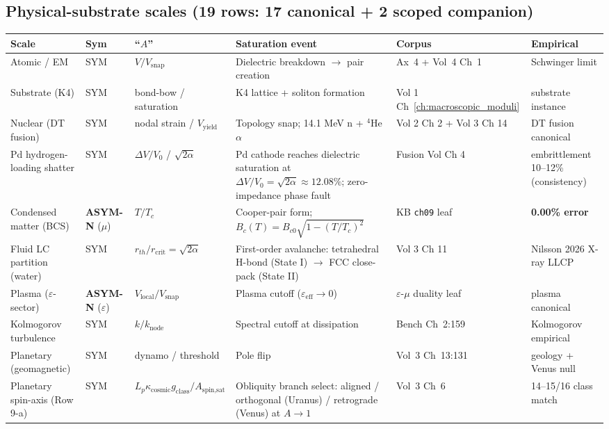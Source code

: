 \subsection{Physical-substrate scales (19 rows: 17 canonical + 2 scoped companion)}

\begin{center}
\renewcommand{\arraystretch}{1.4}
\scriptsize
\begin{tabular}{|p{1.5cm}|p{0.9cm}|p{2.2cm}|p{2.5cm}|p{2.6cm}|p{2.0cm}|}
\hline
\textbf{Scale} & \textbf{Sym} & \textbf{``$A$''} & \textbf{Saturation event} & \textbf{Corpus} & \textbf{Empirical} \\
\hline
Atomic / EM & SYM & $V / V_{\text{snap}}$ & Dielectric breakdown $\to$ pair creation & Ax~4 + Vol~4 Ch~1 & Schwinger limit \\
\hline
Substrate (K4) & SYM & bond-bow / saturation & K4 lattice + soliton formation & Vol 1 Ch~\ref{ch:macroscopic_moduli} & substrate instance \\
\hline
Nuclear (DT fusion) & SYM & nodal strain / $V_{\text{yield}}$ & Topology snap; 14.1 MeV n + $^4$He $\alpha$ & Vol 2 Ch 2 + Vol 3 Ch 14 & DT fusion canonical \\
\hline
Pd hydrogen-loading shatter & SYM & $\Delta V/V_0$ / $\sqrt{2\alpha}$ & Pd cathode reaches dielectric saturation at $\Delta V/V_0 = \sqrt{2\alpha} \approx 12.08\%$; zero-impedance phase fault & Fusion Vol Ch 4 & embrittlement 10--12\% (consistency) \\
\hline
Condensed matter (BCS) & \textbf{ASYM-N} ($\mu$) & $T/T_c$ & Cooper-pair form; $B_c(T) = B_{c0}\sqrt{1-(T/T_c)^2}$ & KB \texttt{ch09} leaf & \textbf{0.00\% error} \\
\hline
Fluid LC partition (water) & SYM & $r_{th}/r_{\text{crit}}=\sqrt{2\alpha}$ & First-order avalanche: tetrahedral H-bond (State I) $\to$ FCC close-pack (State II) & Vol 3 Ch 11 & Nilsson 2026 X-ray LLCP \\
\hline
Plasma ($\varepsilon$-sector) & \textbf{ASYM-N} ($\varepsilon$) & $V_{\text{local}}/V_{\text{snap}}$ & Plasma cutoff ($\varepsilon_{\text{eff}} \to 0$) & $\varepsilon$-$\mu$ duality leaf & plasma canonical \\
\hline
Kolmogorov turbulence & SYM & $k/k_{\text{node}}$ & Spectral cutoff at dissipation & Bench Ch~2:159 & Kolmogorov empirical \\
\hline
Planetary (geomagnetic) & SYM & dynamo / threshold & Pole flip & Vol~3 Ch~13:131 & geology + Venus null \\
\hline
Planetary spin-axis (Row 9-a) & SYM & $L_p \kappa_{\text{cosmic}} g_{\text{class}} / A_{\text{spin,sat}}$ & Obliquity branch select: aligned / orthogonal (Uranus) / retrograde (Venus) at $A \to 1$ & Vol~3 Ch~6 & 14--15/16 class match \\

\end{tabular}
\end{center}
